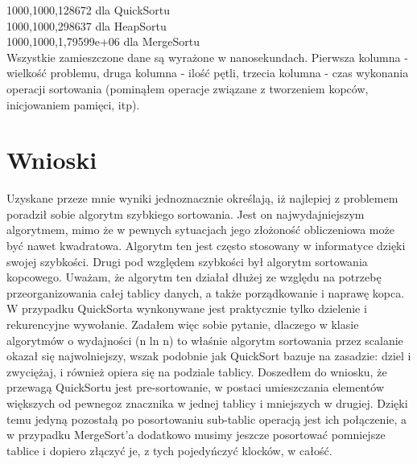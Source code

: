 \documentclass[a4paper,12pt]{report}
\begin{document}
{\raggedleft{}1000,1000,128672 dla QuickSortu} \\
1000,1000,298637 dla HeapSortu \\
1000,1000,1,79599e+06 dla MergeSortu \\


Wszystkie zamieszczone dane są wyrażone w nanosekundach. Pierwsza kolumna - wielkość problemu, druga kolumna - ilość pętli, trzecia kolumna - czas wykonania operacji
sortowania (pominąłem operacje związane z tworzeniem kopców, inicjowaniem pamięci, itp).

\section{Wnioski}
Uzyskane przeze mnie wyniki jednoznacznie określają, iż najlepiej z problemem poradził sobie algorytm szybkiego sortowania. Jest on najwydajniejszym algorytmem, mimo
że w pewnych sytuacjach jego złożoność obliczeniowa może być nawet kwadratowa. Algorytm ten jest często stosowany w informatyce dzięki swojej szybkości. Drugi pod
względem szybkości był algorytm sortowania kopcowego. Uważam, że algorytm ten działał dłużej ze względu na potrzebę przeorganizowania całej tablicy danych, a także
porządkowanie i naprawę kopca. W przypadku QuickSorta wynkonywane jest praktycznie tylko dzielenie i rekurencyjne wywołanie. Zadałem więc sobie pytanie, dlaczego
w klasie algorytmów o wydajności (n ln n) to właśnie algorytm sortowania przez scalanie okazał się najwolniejszy, wszak podobnie jak QuickSort bazuje na zasadzie:
dziel i zwyciężaj, i również opiera się na podziale tablicy. Doszedłem do wniosku, że przewagą QuickSortu jest pre-sortowanie, w postaci umieszczania elementów
większych od pewnegoz znacznika w jednej tablicy i mniejszych w drugiej. Dzięki temu jedyną pozostałą po posortowaniu sub-tablic operacją jest ich połączenie, a w
przypadku MergeSort'a dodatkowo musimy jeszcze posortować pomniejsze tablice i dopiero złączyć je, z tych pojedyńczyć klocków, w całość.
\end{document}
